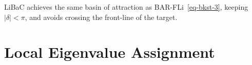 \documentclass[journal,twoside,web]{ieeecolor}
\theoremstyle{definition}
\newcommand{\abs}[1]{\left\lvert#1\right\rvert}
\begin{document}
LiBaC achieves the same basin of attraction as BAR-FLi~\eqref{eq-bkst-3}, keeping $\abs{\delta} < \pi$, and avoids crossing the front-line of the target.





\section{ Local Eigenvalue Assignment}
\label{sec-linearization}


\end{document}
